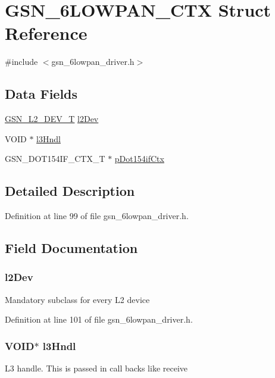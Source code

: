 \hypertarget{a00019}{
\section{GSN\_\-6LOWPAN\_\-CTX Struct Reference}
\label{a00019}
}


{\ttfamily \#include $<$gsn\_\-6lowpan\_\-driver.h$>$}

\subsection*{Data Fields}
\begin{DoxyCompactItemize}
\item 
\hyperlink{a00107}{GSN\_\-L2\_\-DEV\_\-T} \hyperlink{a00019_aa0cd5425da571e5b7ad6c6b116e5a4ed}{l2Dev}
\item 
VOID $\ast$ \hyperlink{a00019_aaeab14901a77de33349412601376b127}{l3Hndl}
\item 
GSN\_\-DOT154IF\_\-CTX\_\-T $\ast$ \hyperlink{a00019_a91d8d05dbfee6a1576323053fad49148}{pDot154ifCtx}
\end{DoxyCompactItemize}


\subsection{Detailed Description}


Definition at line 99 of file gsn\_\-6lowpan\_\-driver.h.



\subsection{Field Documentation}
\hypertarget{a00019_aa0cd5425da571e5b7ad6c6b116e5a4ed}{
\subsubsection[{l2Dev}]{ {\bf l2Dev}}}
\label{a00019_aa0cd5425da571e5b7ad6c6b116e5a4ed}
Mandatory subclass for every L2 device 

Definition at line 101 of file gsn\_\-6lowpan\_\-driver.h.

\hypertarget{a00019_aaeab14901a77de33349412601376b127}{
\subsubsection[{l3Hndl}]{\setlength{\rightskip}{0pt plus 5cm}VOID$\ast$ {\bf l3Hndl}}}
\label{a00019_aaeab14901a77de33349412601376b127}
L3 handle. This is passed in call backs like receive 

